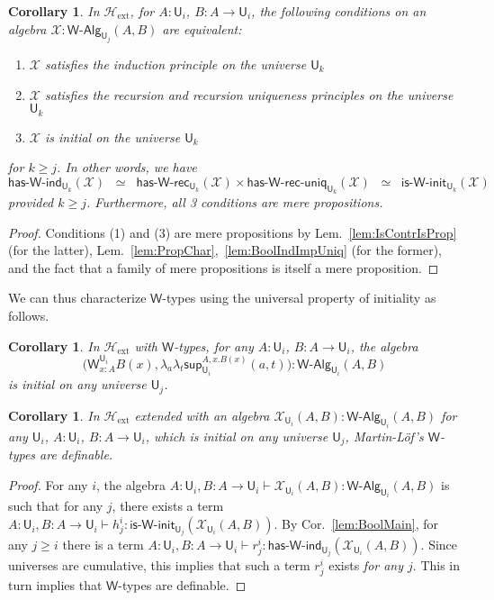 \documentclass[reqno,10pt,a4paper,oneside]{amsart}
\newcommand{\X}{\mathcal{X}}
\newcommand{\lam}[1]{\lambda_{#1}}
\newcommand{\W}{\mathsf{W}}
\newcommand{\wsup}{\mathsf{sup}}
\newcommand{\UU}{\mathsf{U}}
\newcommand{\WAlg}{\mathsf{W}\text{-}\mathsf{Alg}}
\newcommand{\HasWRec}{\mathsf{has}\text{-}\mathsf{W}\text{-}\mathsf{rec}}
\newcommand{\HasWInd}{\mathsf{has}\text{-}\mathsf{W}\text{-}\mathsf{ind}}
\newcommand{\HasWRecUniq}{\mathsf{has}\text{-}\mathsf{W}\text{-}\mathsf{rec}\text{-}\mathsf{uniq}}
\newcommand{\IsWInit}{\mathsf{is}\text{-}\mathsf{\W}\text{-}\mathsf{init}}
\newcommand{\Hext}{\mathcal{H}_{\mathrm{ext}}}
\numberwithin{equation}{section}
\theoremstyle{mythm}
\newtheorem{corollary}[theorem]{Corollary}
\theoremstyle{mydef}
\theoremstyle{myrmk}
\begin{document}
\begin{corollary}\label{lem:WMain}
In $\Hext$, for $A:\UU_i$, $B : A \to \UU_i$, the following conditions on an algebra $\X : \WAlg_{\UU_j}(A,B)$ are equivalent:
\begin{enumerate}
\item $\X$ satisfies the induction principle on the universe $\UU_k$
\item $\X$ satisfies the recursion and recursion uniqueness principles on the universe $\UU_k$
\item $\X$ is initial on the universe $\UU_k$  
\end{enumerate}
for $k \geq j$. In other words, we have \[ \HasWInd_{\UU_k}(\X)  \;\; \simeq \;\; \HasWRec_{\UU_k}(\X) \times \HasWRecUniq_{\UU_k}(\X) \;\; \simeq \;\; \IsWInit_{\UU_k}(\X) \]
provided $k \geq j$. Furthermore, all 3 conditions are mere propositions.
\end{corollary}
\begin{proof}
Conditions (1) and (3) are mere propositions by Lem.~\ref{lem:IsContrIsProp} (for the latter), Lem.~\ref{lem:PropChar},~\ref{lem:BoolIndImpUniq} (for the former), and the fact that a family of mere propositions is itself a mere proposition.
\end{proof}

We can thus characterize $\W$-types using the universal property of initiality as follows.
\begin{corollary}\label{lem:WInit}
In $\Hext$ with $\W$-types, for any $A:\UU_i$, $B : A \to \UU_i$, the algebra \[\Big(\W^{\UU_i}_{x:A}B(x),\lam{a}\lam{t} \wsup_{\UU_i}^{A,x.B(x)}(a,t) \Big) : \WAlg_{\UU_i}(A,B)\] is initial on any universe $\UU_j$.
\end{corollary}

\begin{corollary}\label{lem:WChar}
In $\Hext$ extended with an algebra $\X_{\UU_i}(A,B) : \WAlg_{\UU_i}(A,B)$ for any $\UU_i$, $A : \UU_i$, $B : A \to \UU_i$, which is initial on any universe $\UU_j$, Martin-L{\"o}f's $\W$-types are definable.
\end{corollary}
\begin{proof}
For any $i$, the algebra $A:\UU_i,B:A\to \UU_i \vdash \X_{\UU_i}(A,B) : \WAlg_{\UU_i}(A,B)$ is such that for any $j$, there exists a term $A:\UU_i,B:A\to \UU_i \vdash h^i_j  : \IsWInit_{\UU_j}(\X_{\UU_i}(A,B))$. By Cor.~\ref{lem:BoolMain}, for any $j \geq i$ there is a term $A:\UU_i,B:A\to \UU_i \vdash r^i_j : \HasWInd_{\UU_j}(\X_{\UU_i}(A,B))$. Since universes are cumulative, this implies that such a term $r^i_j$ exists \emph{for any $j$}. This in turn implies that $\W$-types are definable.
\end{proof}
\end{document}
